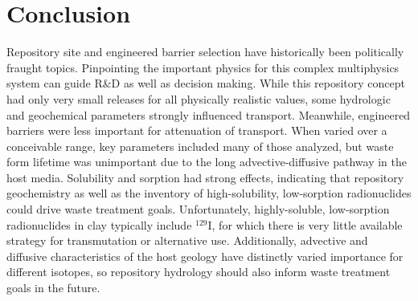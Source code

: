 \section{Conclusion}

Repository site and engineered barrier selection have historically been 
politically fraught topics.  Pinpointing the important physics for this complex 
multiphysics system can guide R\&D as well as decision making.  While this 
repository concept had only very small releases for all physically realistic 
values, some hydrologic and geochemical parameters strongly influenced 
transport.  Meanwhile, engineered barriers were less important for attenuation 
of transport.  When varied over a conceivable range, key parameters included 
many of those analyzed, but waste form lifetime was unimportant due to the long 
advective-diffusive pathway in the host media. Solubility and sorption had 
strong effects, indicating that repository geochemistry as well as the inventory 
of high-solubility, low-sorption radionuclides could drive waste treatment 
goals. Unfortunately, highly-soluble, low-sorption radionuclides in clay 
typically include $^{129}$I, for which there is very little available strategy 
for transmutation or alternative use. Additionally, advective and diffusive 
characteristics of the host geology have distinctly varied importance for 
different isotopes, so repository hydrology should also inform waste treatment 
goals in the future. 
